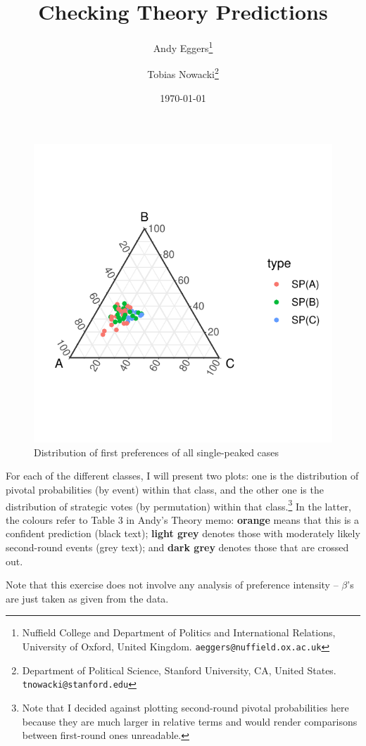 \documentclass[11pt, letter, margin = 2 in]{article}
\begin{document}
\author{Andy Eggers\thanks{Nuffield College and Department of Politics and International Relations, University of Oxford, United Kingdom. \texttt{aeggers@nuffield.ox.ac.uk}}
\and
Tobias Nowacki\thanks{Department of Political Science, Stanford University, CA, United States. \texttt{tnowacki@stanford.edu}}}
\date{\today}
\title{Checking Theory Predictions}

\maketitle

\begin{figure}[!htb]
	\centering
	\includegraphics[width = .6\textwidth]{../output/figures/prediction/sp_cases_tern.pdf}
	\caption{Distribution of first preferences of all single-peaked cases}
	\label{fig:figure1}
\end{figure}


For each of the different classes, I will present two plots: one is the distribution of pivotal probabilities (by event) within that class, and the other one is the distribution of strategic votes (by permutation) within that class.\footnote{Note that I decided against plotting second-round pivotal probabilities here because they are much larger in relative terms and would render comparisons between first-round ones unreadable.} In the latter, the colours refer to Table 3 in Andy's Theory memo: \textbf{orange} means that this is a confident prediction (black text); \textbf{light grey} denotes those with moderately likely second-round events (grey text); and \textbf{dark grey} denotes those that are crossed out.

Note that this exercise does not involve any analysis of preference intensity -- $\beta$'s are just taken as given from the data.
\end{document}
